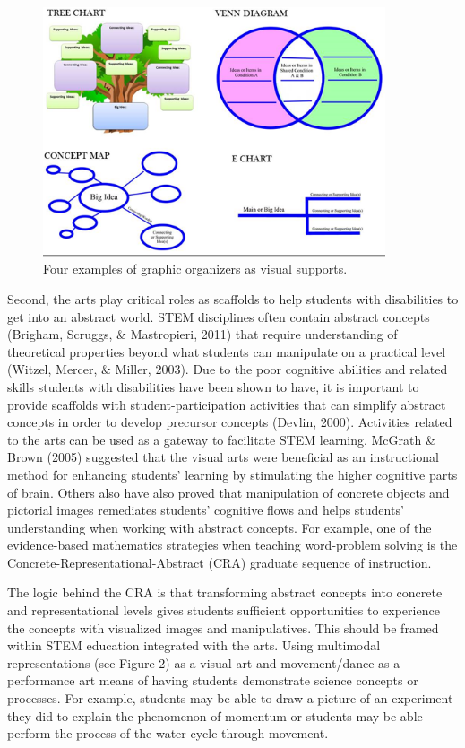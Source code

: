 \documentclass[11.5pt]{sig-alternate} %
\begin{document}
\begin{large}
 \begin{figure}[th]
     \centering
     \includegraphics[width=0.9\textwidth]{fig1.png}
     \caption{ Four examples of graphic organizers as visual supports.}
 \end{figure}

Second, the arts play critical roles as scaffolds to help students with disabilities to get into an abstract world. STEM disciplines often contain abstract concepts (Brigham, Scruggs, \& Mastropieri, 2011) that require understanding of theoretical properties beyond what students can manipulate on a practical level (Witzel, Mercer, \& Miller, 2003). Due to the poor cognitive abilities and related skills students with disabilities have been shown to have, it is important to provide scaffolds with student-participation activities that can simplify abstract concepts in order to develop precursor concepts (Devlin, 2000). Activities related to the arts can be used as a gateway to facilitate STEM learning. McGrath \& Brown (2005) suggested that the visual arts were beneficial as an instructional method for enhancing students’ learning by stimulating the higher cognitive parts of brain. Others also have also proved that manipulation of concrete objects and pictorial images remediates students’ cognitive flows and helps students’ understanding when working with abstract concepts. For example, one of the evidence-based mathematics strategies when teaching word-problem solving is the Concrete-Representational-Abstract (CRA) graduate sequence of instruction. 

The logic behind the CRA is that transforming abstract concepts into concrete and representational levels gives students sufficient opportunities to experience the concepts with visualized images and manipulatives. This should be framed within STEM education integrated with the arts. Using multimodal representations (see Figure 2) as a visual art and movement/dance as a performance art means of having students demonstrate science concepts or processes.  For example, students may be able to draw a picture of an experiment they did to explain the phenomenon of momentum or students may be able perform the process of the water cycle through movement.


\end{large}
\end{document}
